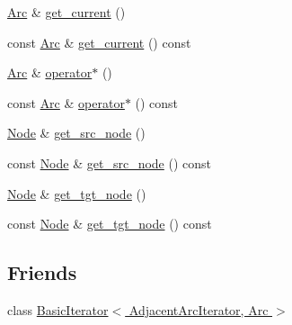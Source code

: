 \begin{DoxyCompactItemize}
\item 
\hyperlink{class_designar_1_1_digraph_a0ceb278671f2a535c00fddccdeafd69f}{Arc} \& \hyperlink{class_designar_1_1_digraph_1_1_adjacent_arc_iterator_abd6687753cb547318760e8f3b87922e2}{get\+\_\+current} ()
\item 
const \hyperlink{class_designar_1_1_digraph_a0ceb278671f2a535c00fddccdeafd69f}{Arc} \& \hyperlink{class_designar_1_1_digraph_1_1_adjacent_arc_iterator_ac388275a16db45fc754a193766c215ce}{get\+\_\+current} () const
\item 
\hyperlink{class_designar_1_1_digraph_a0ceb278671f2a535c00fddccdeafd69f}{Arc} \& \hyperlink{class_designar_1_1_digraph_1_1_adjacent_arc_iterator_a2a1ee85a8076e07fd99d35676ec69887}{operator$\ast$} ()
\item 
const \hyperlink{class_designar_1_1_digraph_a0ceb278671f2a535c00fddccdeafd69f}{Arc} \& \hyperlink{class_designar_1_1_digraph_1_1_adjacent_arc_iterator_aaf54c97702c3b6e3ccf419c2f7966e44}{operator$\ast$} () const
\item 
\hyperlink{class_designar_1_1_digraph_a4dc921c41a480b7946a04170e997d8ae}{Node} \& \hyperlink{class_designar_1_1_digraph_1_1_adjacent_arc_iterator_a72e125198f4cea2ab0ac1213c1cbc1e4}{get\+\_\+src\+\_\+node} ()
\item 
const \hyperlink{class_designar_1_1_digraph_a4dc921c41a480b7946a04170e997d8ae}{Node} \& \hyperlink{class_designar_1_1_digraph_1_1_adjacent_arc_iterator_a09c51f5124610cd6e5360dc7039b4639}{get\+\_\+src\+\_\+node} () const
\item 
\hyperlink{class_designar_1_1_digraph_a4dc921c41a480b7946a04170e997d8ae}{Node} \& \hyperlink{class_designar_1_1_digraph_1_1_adjacent_arc_iterator_ad1df4c6624e411ea5ec10ee3d1414b1c}{get\+\_\+tgt\+\_\+node} ()
\item 
const \hyperlink{class_designar_1_1_digraph_a4dc921c41a480b7946a04170e997d8ae}{Node} \& \hyperlink{class_designar_1_1_digraph_1_1_adjacent_arc_iterator_a3b5e320227b6456e9b0de9d505e0eae4}{get\+\_\+tgt\+\_\+node} () const
\end{DoxyCompactItemize}
\subsection*{Friends}
\begin{DoxyCompactItemize}
\item 
class \hyperlink{class_designar_1_1_digraph_1_1_adjacent_arc_iterator_a73ad70d76f3331ee4b07451db1347918}{Basic\+Iterator$<$ Adjacent\+Arc\+Iterator, Arc $>$}
\end{DoxyCompactItemize}

